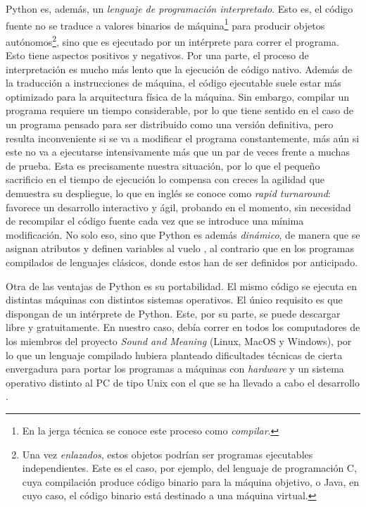 Python es, además, un \textit{lenguaje de programación interpretado}. Esto es, el código fuente no se traduce a valores binarios de máquina\footnote{En la jerga técnica se conoce este proceso como \textit{compilar}.} para producir objetos autónomos\footnote{Una vez \textit{enlazados}, estos objetos podrían ser programas ejecutables independientes. Este es el caso, por ejemplo, del lenguaje de programación C, cuya compilación produce código binario para la máquina objetivo, o Java, en cuyo caso, el código binario está destinado a una máquina virtual.}, sino que es ejecutado por un intérprete para correr el programa. Esto tiene aspectos positivos y negativos. Por una parte, el proceso de interpretación es mucho más lento que la ejecución de código nativo. Además de la traducción a instrucciones de máquina, el código ejecutable suele estar más optimizado para la arquitectura física de la máquina. Sin embargo, compilar un programa requiere un tiempo considerable, por lo que tiene sentido en el caso de un programa pensado para ser distribuido como una versión definitiva, pero resulta inconveniente si se va a modificar el programa  constantemente, más aún si este no va a ejecutarse intensivamente más que un par de veces  frente a muchas de prueba. Esta es precisamente nuestra situación, por lo que el pequeño sacrificio en el tiempo de ejecución lo compensa con creces la agilidad que demuestra su despliegue, lo que en inglés se conoce como \textit{rapid turnaround}: favorece un desarrollo interactivo y ágil, probando en el momento, sin necesidad de recompilar el código fuente cada vez que se introduce una mínima modificación. No solo eso, sino que Python es además \textit{dinámico}, de manera que se asignan atributos y definen variables al vuelo \parencite[xiii]{bird2009}, al contrario que en los programas compilados de lenguajes clásicos, donde estos han de ser definidos por anticipado.

Otra de las ventajas de Python es su portabilidad. El mismo código se ejecuta en distintas máquinas con distintos sistemas operativos. El único requisito es que dispongan de un intérprete de Python. Este, por su parte, se puede descargar libre y gratuitamente. En nuestro caso, debía correr en todos los computadores de los miembros del proyecto \textit{Sound and Meaning} (Linux, MacOS y Windows), por lo que un lenguaje compilado hubiera planteado dificultades técnicas de cierta envergadura para portar los programas a máquinas con \textit{hardware} y un sistema operativo distinto al PC de tipo Unix con el que se ha llevado a cabo el desarrollo \parencite[16-17]{lutz2013}. 

